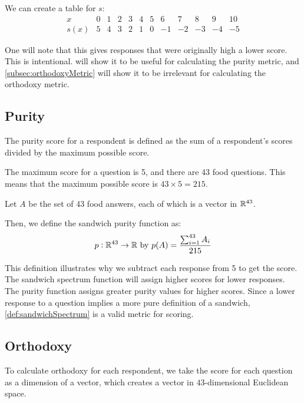 We can create a table for $s$:
\begin{equation*}
	\begin{array}{l|r|r|r|r|r|r|r|r|r|r|r}
		x    & 0 & 1 & 2 & 3 & 4 & 5 &  6 &  7 &  8 &  9 & 10\\\hline
		s(x) & 5 & 4 & 3 & 2 & 1 & 0 & -1 & -2 & -3 & -4 & -5
	\end{array}
\end{equation*}

One will note that this gives responses that were originally high a lower score.
This is intentional.
 will show it to be useful for calculating the purity metric, and \vref{subsec:orthodoxyMetric} will show it to be irrelevant for calculating the orthodoxy metric.

\subsection{Purity}\label{subsec:purityMetric}
The purity score for a respondent is defined as the sum of a respondent's scores divided by the maximum possible score.

The maximum score for a question is 5, and there are 43 food questions.
This means that the maximum possible score is $43 \times 5 = 215$.

\begin{definition}
	Let $A$ be the set of 43 food answers, each of which is a vector in $\mathbb{R}^{43}$.

	Then, we define the sandwich purity function as:
	\begin{equation}
		p : \mathbb{R}^{43} \to \mathbb{R}\ \text{by}\ p(A) = \frac{\sum_{i = 1}^{43} A_i}{215}
	\end{equation}
\end{definition}

This definition illustrates why we subtract each response from 5 to get the score.
The sandwich spectrum function will assign higher scores for lower responses.
The purity function assigns greater purity values for higher scores.
Since a lower response to a question implies a more pure definition of a sandwich, \vref{def:sandwichSpectrum} is a valid metric for scoring.

\subsection{Orthodoxy}\label{subsec:orthodoxyMetric}
To calculate orthodoxy for each respondent, we take the score for each question as a dimension of a vector, which creates a vector in $43$-dimensional Euclidean space.

